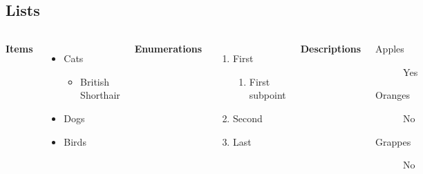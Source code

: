 \subsection{Lists}

\begin{frame}
    \begin{columns}[T,onlytextwidth]
      \textbf{Items}
      \begin{itemize}
        \item Cats 
        \begin{itemize}
            \item British Shorthair
        \end{itemize}
        \item Dogs \item Birds
      \end{itemize}

      \textbf{Enumerations}
      \begin{enumerate}
        \item First 
        \begin{enumerate}
            \item First subpoint
        \end{enumerate}
        \item Second \item Last
      \end{enumerate}

      \textbf{Descriptions}
      \begin{description}
        \item[Apples] Yes \item[Oranges] No \item[Grappes] No
      \end{description}
\end{columns}
\end{frame}

